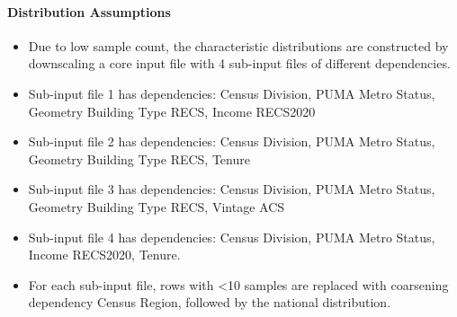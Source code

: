 \paragraph{Distribution Assumptions}
% 
\begin{itemize}
\item
  Due to low sample count, the characteristic distributions are constructed by downscaling a core
  input file with 4 sub-input files of different dependencies.
\item Sub-input file 1 has dependencies: \textquotesingle Census
  Division\textquotesingle, \textquotesingle PUMA Metro
  Status\textquotesingle, \textquotesingle Geometry Building Type
  RECS\textquotesingle, \textquotesingle Income
  RECS2020\textquotesingle{}
\item
  Sub-input file 2 has dependencies: \textquotesingle Census Division\textquotesingle,
  \textquotesingle PUMA Metro Status\textquotesingle,
  \textquotesingle Geometry Building Type RECS\textquotesingle,
  \textquotesingle Tenure\textquotesingle{}
\item
  Sub-input file 3 has dependencies: \textquotesingle Census Division\textquotesingle,
  \textquotesingle PUMA Metro Status\textquotesingle,
  \textquotesingle Geometry Building Type RECS\textquotesingle,
  \textquotesingle Vintage ACS\textquotesingle{}
\item
  Sub-input file 4 has dependencies: \textquotesingle Census Division\textquotesingle,
  \textquotesingle PUMA Metro Status\textquotesingle,
  \textquotesingle Income RECS2020\textquotesingle,
  \textquotesingle Tenure\textquotesingle.
\item For each sub-input file, rows with
  \textless10 samples are replaced with coarsening dependency Census
  Region, followed by the national distribution.
\end{itemize}
